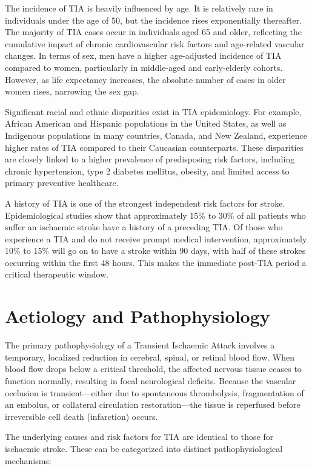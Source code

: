 The incidence of TIA is heavily influenced by age. It is relatively rare in individuals under the age of 50, but the incidence rises exponentially thereafter. The majority of TIA cases occur in individuals aged 65 and older, reflecting the cumulative impact of chronic cardiovascular risk factors and age-related vascular changes. In terms of sex, men have a higher age-adjusted incidence of TIA compared to women, particularly in middle-aged and early-elderly cohorts. However, as life expectancy increases, the absolute number of cases in older women rises, narrowing the sex gap.

Significant racial and ethnic disparities exist in TIA epidemiology. For example, African American and Hispanic populations in the United States, as well as Indigenous populations in many countries, Canada, and New Zealand, experience higher rates of TIA compared to their Caucasian counterparts. These disparities are closely linked to a higher prevalence of predisposing risk factors, including chronic hypertension, type 2 diabetes mellitus, obesity, and limited access to primary preventive healthcare.

A history of TIA is one of the strongest independent risk factors for stroke. Epidemiological studies show that approximately 15\% to 30\% of all patients who suffer an ischaemic stroke have a history of a preceding TIA. Of those who experience a TIA and do not receive prompt medical intervention, approximately 10\% to 15\% will go on to have a stroke within 90 days, with half of these strokes occurring within the first 48 hours. This makes the immediate post-TIA period a critical therapeutic window.

\section*{Aetiology and Pathophysiology}
The primary pathophysiology of a Transient Ischaemic Attack involves a temporary, localized reduction in cerebral, spinal, or retinal blood flow. When blood flow drops below a critical threshold, the affected nervous tissue ceases to function normally, resulting in focal neurological deficits. Because the vascular occlusion is transient---either due to spontaneous thrombolysis, fragmentation of an embolus, or collateral circulation restoration---the tissue is reperfused before irreversible cell death (infarction) occurs.

The underlying causes and risk factors for TIA are identical to those for ischaemic stroke. These can be categorized into distinct pathophysiological mechanisms:

